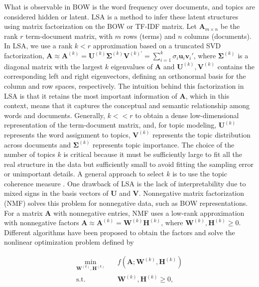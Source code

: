 \documentclass{article}
\begin{document}
What is observable in BOW is the word frequency over documents, and topics are considered hidden or latent. LSA is a method to infer these latent structures using matrix factorization on the BOW or TF-IDF matrix. Let $\mathbf{A}_{m\times n}$ be the rank $r$ term-document matrix, with $m$ rows (terms) and $n$ columns (documents). In LSA, we use a rank $k<r$ approximation based on a truncated SVD factorization, $\mathbf{A}\approx\mathbf{A}^{(k)}=\mathbf{U}^{(k)}\boldsymbol{\Sigma}^{(k)}\mathbf{V}^{(k)'} =\sum_{i=1}^k \sigma_i\mathbf{u}_i\mathbf{v}_i'$, where $\boldsymbol{\Sigma}^{(k)}$ is a diagonal matrix with the largest $k$ eigenvalues of $\mathbf{A}$ and $\mathbf{U}^{(k)}, \mathbf{V}^{(k)}$ contains the corresponding left and right eigenvectors, defining an orthonormal basis for the column and row spaces, respectively. The intuition behind this factorization in LSA is that it retains the most important information of $\mathbf{A}$, which in this context, means that it captures the conceptual and semantic relationship among words and documents. Generally, $k<< r$  to obtain a dense low-dimensional representation of the term-document matrix, and, for topic modeling, $\mathbf{U}^{(k)}$ represents the word assignment to topics, $\mathbf{V}^{(k)}$ represents the topic distribution across documents and $\boldsymbol{\Sigma}^{(k)}$ represents topic importance. The choice of the number of topics $k$ is critical because it must be sufficiently large to fit all the real structure in the data but sufficiently small to avoid fitting the sampling error or unimportant details. A general approach to select $k$ is to use the topic coherence measure \citep{chang_NIPS2009, newman2010}. One drawback of LSA is the lack of interpretability due to mixed signs in the basis vectors of $\mathbf{U}$ and $\mathbf{V}$. Nonnegative matrix factorization (NMF) solves this problem for nonnegative data, such as BOW representations. For a matrix $\mathbf{A}$ with nonnegative entries, NMF uses a low-rank approximation with nonnegative factors $\mathbf{A}\approx\mathbf{A}^{(k)}=\mathbf{W}^{(k)} \mathbf{H}^{(k)}$, where $\mathbf{W}^{(k)}, \mathbf{H}^{(k)} \geq 0$. Different algorithms have been proposed to obtain the factors \citep{cichocki2009, lee-NIPS2001} and solve the nonlinear optimization problem defined by

\begin{equation}
    \label{eq:nmf1}
    \begin{aligned}
        \displaystyle \min_{\mathbf{W}^{(k)}, \mathbf{H}^{(k)}} \quad & f(\mathbf{A};\mathbf{W}^{(k)}, \mathbf{H}^{(k)}) \\
        \textrm{s.t.} \quad & \mathbf{W}^{(k)}, \mathbf{H}^{(k)} \geq 0,
    \end{aligned}
\end{equation}
\end{document}

